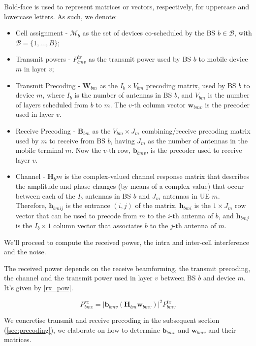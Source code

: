 Bold-face is used to represent matrices or vectors, respectively, for uppercase and lowercase letters. As such, we denote:
\begin{itemize}
    \item Cell assignment - $\mathcal{M}_b$ as the set of devices co-scheduled by the \ac{BS} $b \in \mathcal{B}$, with $\mathcal{B} = \{1,..., B\}$;
    \item Transmit powers - $P_{bmv}^{tx}$ as the transmit power used by \ac{BS} $b$ to mobile device $m$ in layer $v$;
    \item Transmit Precoding - $\bm{W}_{bm}$ as the $I_b \times V_{bm}$ precoding matrix, used by \ac{BS} $b$ to device $m$, where $I_b$ is the number of antennas in \ac{BS} $b$, and $V_{bm}$ is the number of layers scheduled from $b$ to $m$. The $v$-th column vector $\bm{w}_{bmv}$ is the precoder used in layer $v$.
    \item Receive Precoding - $\bm{B}_{bm}$ as the $V_{bm} \times J_m$ combining/receive precoding matrix used by $m$ to receive from BS $b$, having $J_m$ as the number of antennas in the mobile terminal $m$. Now the $v$-th row, $\bm{b}_{bmv}$, is the precoder used to receive layer $v$.
    \item Channel - $\bm{H}_bm$ is the complex-valued channel response matrix that describes the amplitude and phase changes (by means of a complex value) that occur between each of the $I_b$ antennas in \ac{BS} $b$ and $J_m$ antennas in \ac{UE} $m$. Therefore, $\bm{h}_{bmij}$ is the entrance $(i,j)$ of the matrix, $\bm{h}_{bmi}$ is the $1 \times J_m$ row vector that can be used to precode from $m$ to the $i$-th antenna of $b$, and $\bm{h}_{bmj}$ is the $I_b \times 1$ column vector that associates $b$ to the $j$-th antenna of $m$.
\end{itemize}


We'll proceed to compute the received power, the intra and inter-cell interference and the noise.

The received power depends on the receive beamforming, the transmit precoding, the channel and the transmit power used in layer $v$ between \ac{BS} $b$ and device $m$. It's given by \eqref{rx_pow}.

\begin{equation} \label{rx_pow}
    P_{bmv}^{rx} = \left|\bm{b}_{bmv} \left( \bm{H}_{bm} \bm{w}_{bmv} \right)\right|^2 P^{tx}_{bmv}
\end{equation}


We concretise transmit and receive precoding in the subsequent section (\ref{sec:precoding}), we elaborate on how to determine $\bm{b}_{bmv}$ and $\bm{w}_{bmv}$ and their matrices. 

